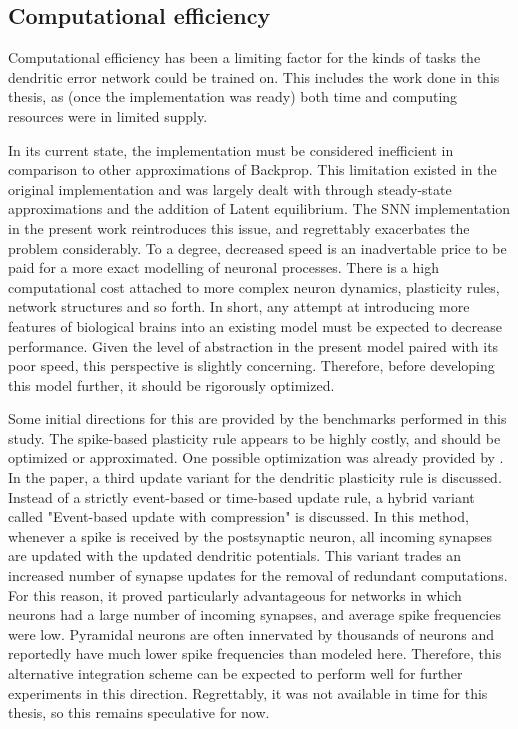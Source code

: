\subsection{Computational efficiency}

Computational efficiency has been a limiting factor for the kinds of tasks the dendritic error network
could be trained on. This includes the work done in this thesis, as (once the implementation was ready) both time and
computing resources were in limited supply.  

In its current state, the implementation must be considered inefficient in comparison to other approximations of
Backprop. This limitation existed in the original implementation and was largely dealt with through steady-state
approximations and the addition of Latent equilibrium. The SNN implementation in the present work reintroduces this
issue, and regrettably exacerbates the problem considerably. To a degree, decreased speed is an inadvertable price to be
paid for a more exact modelling of neuronal processes. There is a high computational cost attached to more complex
neuron dynamics, plasticity rules, network structures and so forth. In short, any attempt at introducing more features
of biological brains into an existing model must be expected to decrease performance. Given the level of
abstraction in the present model paired with its poor speed, this perspective is slightly concerning. Therefore, before
developing this model further, it should be rigorously optimized. 

Some initial directions for this are provided by the benchmarks performed in this study. The spike-based plasticity rule
appears to be highly costly, and should be optimized or approximated. One possible optimization was already provided by
\citep{Stapmanns2021}. In the paper, a third update variant for the dendritic plasticity rule is discussed. Instead of a
strictly event-based or time-based update rule, a hybrid variant called "Event-based update with compression" is
discussed. In this method, whenever a spike is received by the postsynaptic neuron, all incoming synapses are updated
with the updated dendritic potentials. This variant trades an increased number of synapse updates for the removal of
redundant computations. For this reason, it proved particularly advantageous for networks in which neurons had a large
number of incoming synapses, and average spike frequencies were low. Pyramidal neurons are often innervated by thousands
of neurons \citeme and reportedly have much lower spike frequencies than modeled here. Therefore, this alternative
integration scheme can be expected to perform well for further experiments in this direction. Regrettably, it was not
available in time for this thesis, so this remains speculative for now.

